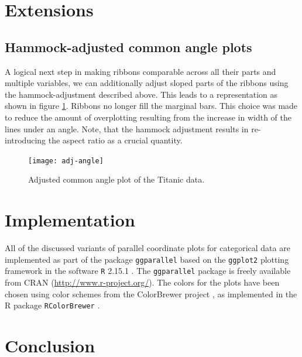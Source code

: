 \section{Extensions}
\subsection{Hammock-adjusted common angle plots}
A logical next step in making ribbons comparable across all their parts and multiple variables, we can additionally adjust sloped parts of the ribbons using the hammock-adjustment described above. This leads to a representation as shown in figure \ref{adj.angle}. Ribbons no longer fill the marginal bars. This choice was made to reduce the amount of overplotting resulting from the increase in width of the lines under an angle. Note, that the hammock adjustment results in re-introducing the aspect ratio as a crucial quantity. 
\begin{figure}[hbtp]
\texttt{[image: adj-angle]}
\caption{Adjusted common angle plot of the Titanic data.}
\label{adj.angle}
\end{figure}
\section{Implementation}

All  of the discussed variants of parallel coordinate plots for categorical data are implemented as part of the package {\tt ggparallel} based on the {\tt ggplot2} \cite{ggplot2} plotting framework in the software {\tt R} 2.15.1 \citep{R}. The  {\tt ggparallel} package is freely available from CRAN (\url{http://www.r-project.org/}).
The colors for the plots have been chosen using color schemes from the ColorBrewer project  \cite{colorbrewer} , as implemented in the R package {\tt RColorBrewer}  \cite{RColorBrewer} .


\section{Conclusion}





